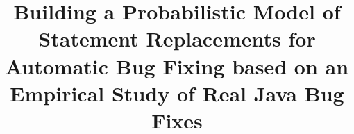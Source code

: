 \documentclass{sig-alternate-05-2015}
\begin{document}









%

\title{Building a Probabilistic Model of Statement Replacements for Automatic Bug Fixing based on an Empirical Study of Real Java Bug Fixes}

%
%
%
%
%
\end{document}
